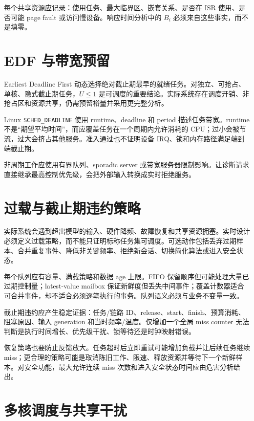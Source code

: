 每个共享资源应记录：使用任务、最大临界区、嵌套关系、是否在 ISR 使用、是否可能 page fault 或访问慢设备。响应时间分析中的 $B_i$ 必须来自这些事实，而不是填零。

\section{EDF 与带宽预留}

Earliest Deadline First 动态选择绝对截止期最早的就绪任务。对独立、可抢占、单核、隐式截止期任务，$U\le1$ 是可调度的重要结论。实际系统存在调度开销、非抢占区和资源共享，仍需预留裕量并采用更完整分析。

Linux \texttt{SCHED\_DEADLINE} 使用 runtime、deadline 和 period 描述任务带宽\cite{linux-sched-deadline}。runtime 不是“期望平均时间”，而应覆盖任务在一个周期内允许消耗的 CPU；过小会被节流，过大会挤占其他服务。准入通过也不证明设备 IRQ、锁和内存路径满足端到端截止期。

非周期工作应使用有界队列、sporadic server 或带宽服务器限制影响。让诊断请求直接继承最高控制优先级，会把外部输入转换成实时拒绝服务。

\section{过载与截止期违约策略}

实际系统会遇到超出模型的输入、硬件降频、故障恢复和共享资源拥塞。实时设计必须定义过载策略，而不能只证明标称任务集可调度。可选动作包括丢弃过期样本、合并重复事件、降低非关键频率、拒绝新会话、切换简化算法或进入安全状态。

每个队列应有容量、满载策略和数据 age 上限。FIFO 保留顺序但可能处理大量已过期控制量；latest-value mailbox 保证新鲜度但丢失中间事件；覆盖计数器适合可合并事件，却不适合必须逐笔执行的事务。队列语义必须与业务不变量一致。

截止期违约应产生稳定证据：任务/链路 ID、release、start、finish、预算消耗、阻塞原因、输入 generation 和当时频率/温度。仅增加一个全局 miss counter 无法判断是执行时间增长、优先级干扰、锁等待还是时钟映射错误。

恢复策略也要防止反馈放大。任务超时后立即重试可能增加负载并让后续任务继续 miss；更合理的策略可能是取消陈旧工作、限速、释放资源并等待下一个新鲜样本。对安全功能，最大允许连续 miss 次数和进入安全状态时间应由危害分析给出。

\section{多核调度与共享干扰}

